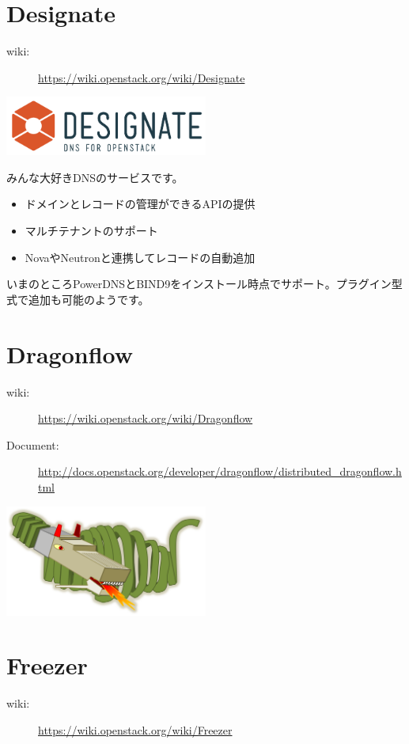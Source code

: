 \section{Designate}
\begin{description}
	\item[wiki:] \url{https://wiki.openstack.org/wiki/Designate}
\end{description}

\includegraphics[width=0.5\textwidth]{img/logo-designate.pdf}

みんな大好きDNSのサービスです。
\begin{itemize}
	\item ドメインとレコードの管理ができるAPIの提供
	\item マルチテナントのサポート
	\item NovaやNeutronと連携してレコードの自動追加
\end{itemize}
いまのところPowerDNSとBIND9をインストール時点でサポート。プラグイン型式で追加も可能のようです。

\section{Dragonflow}
\begin{description}
	\item[wiki:] \url{https://wiki.openstack.org/wiki/Dragonflow}
	\item[Document:] \url{http://docs.openstack.org/developer/dragonflow/distributed_dragonflow.html}
\end{description}
\includegraphics[width=0.5\textwidth]{img/Df_logo.png}

\section{Freezer}
\begin{description}
	\item[wiki:] \url{https://wiki.openstack.org/wiki/Freezer}
\end{description}

